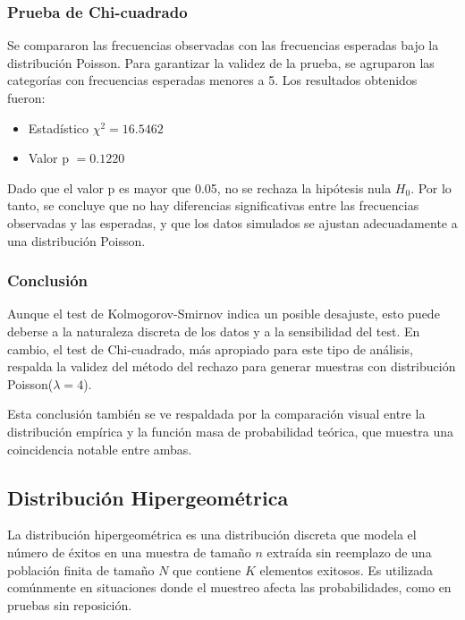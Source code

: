 \documentclass{article}
\begin{document}
\subsubsection{Prueba de Chi-cuadrado}

Se compararon las frecuencias observadas con las frecuencias esperadas bajo la distribución Poisson. Para garantizar la validez de la prueba, se agruparon las categorías con frecuencias esperadas menores a 5. Los resultados obtenidos fueron:

\begin{itemize}
    \item Estadístico \(\chi^2 = 16.5462\)
    \item Valor p \(= 0.1220\)
\end{itemize}

Dado que el valor p es mayor que 0.05, no se rechaza la hipótesis nula \(H_0\). Por lo tanto, se concluye que no hay diferencias significativas entre las frecuencias observadas y las esperadas, y que los datos simulados se ajustan adecuadamente a una distribución Poisson.

\subsubsection{Conclusión}

Aunque el test de Kolmogorov-Smirnov indica un posible desajuste, esto puede deberse a la naturaleza discreta de los datos y a la sensibilidad del test. En cambio, el test de Chi-cuadrado, más apropiado para este tipo de análisis, respalda la validez del método del rechazo para generar muestras con distribución Poisson(\(\lambda = 4\)).

Esta conclusión también se ve respaldada por la comparación visual entre la distribución empírica y la función masa de probabilidad teórica, que muestra una coincidencia notable entre ambas.





\subsection{Distribución Hipergeométrica}
La distribución hipergeométrica es una distribución discreta que modela el número de éxitos en una muestra de tamaño $n$ extraída sin reemplazo de una población finita de tamaño $N$ que contiene $K$ elementos exitosos. Es utilizada comúnmente en situaciones donde el muestreo afecta las probabilidades, como en pruebas sin reposición.
\end{document}
